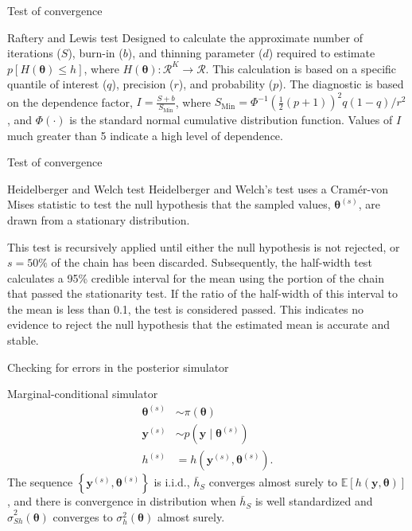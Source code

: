 \documentclass[12pt, compress]{beamer}
\begin{document}
\begin{frame}{Test of convergence}
	\begin{block}{Raftery and Lewis test}
		Designed to calculate the approximate number of iterations ($S$), burn-in ($b$), and thinning parameter ($d$) required to estimate $p\left[H(\bm{\theta}) \leq h\right]$, where $H(\bm{\theta}): \mathcal{R}^K \rightarrow \mathcal{R}$. This calculation is based on a specific quantile of interest ($q$), precision ($r$), and probability ($p$). The diagnostic is based on the dependence factor, $I = \frac{S + b}{S_{\text{Min}}}$, where $S_{\text{Min}} = \Phi^{-1}\left(\frac{1}{2}(p+1)\right)^2 q(1-q) / r^2$, and $\Phi(\cdot)$ is the standard normal cumulative distribution function. Values of $I$ much greater than 5 indicate a high level of dependence.
	\end{block}
\end{frame}

\begin{frame}{Test of convergence}
	\begin{block}{Heidelberger and Welch test}
Heidelberger and Welch's test uses a Cramér-von Mises statistic to test the null hypothesis that the sampled values, $\bm{\theta}^{(s)}$, are drawn from a stationary distribution.

This test is recursively applied until either the null hypothesis is not rejected, or $s = 50\%$ of the chain has been discarded. Subsequently, the half-width test calculates a 95\% credible interval for the mean using the portion of the chain that passed the stationarity test. If the ratio of the half-width of this interval to the mean is less than 0.1, the test is considered passed. This indicates no evidence to reject the null hypothesis that the estimated mean is accurate and stable.
	\end{block}
\end{frame}

\begin{frame}{Checking for errors in the posterior simulator}
	\begin{block}{Marginal-conditional simulator}
\begin{align*}
	\bm{\theta}^{(s)} &\sim \pi(\bm{\theta})\\
	\bm{y}^{(s)} &\sim p(\bm{y}\mid \bm{\theta}^{(s)})\\
	h^{(s)} &= h(\bm{y}^{(s)},\bm{\theta}^{(s)}). 
\end{align*}
The sequence $\left\{\bm{y}^{(s)},\bm{\theta}^{(s)}\right\}$ is i.i.d., $\bar{h}_S$ converges almost surely to $\mathbb{E}[h(\bm{y},\bm{\theta})]$, and there is convergence in distribution when $\bar{h}_S$ is well standardized and $\hat{\sigma}^2_{Sh}(\bm{\theta})$ converges to ${\sigma}^2_h(\bm{\theta})$ almost surely.
	\end{block}
\end{frame}
\end{document}

